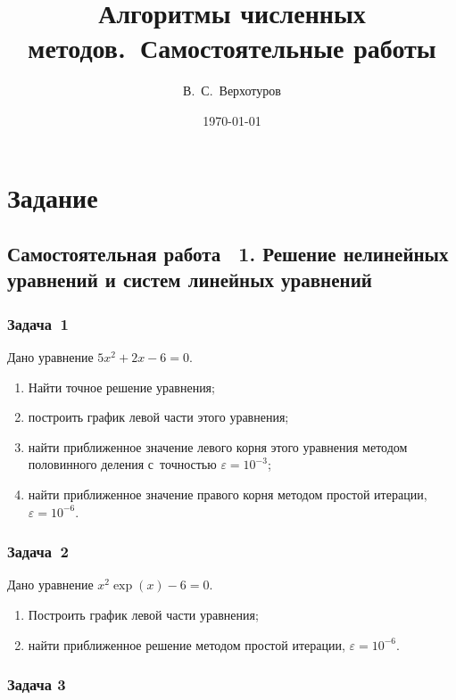 \documentclass[10pt, a4paper, titlepage, oneside]{article}
\title{Алгоритмы численных методов.~Самостоятельные работы}
\author{В.~С.~Верхотуров}
\affil{БСБО-05-20}
\affil{РТУ МИРЭА}
\date\today
\begin{document}
\maketitle

\tableofcontents
\newpage

\section*{Задание}


\subsection*{Самостоятельная работа \textnumero~1. Решение нелинейных уравнений и систем линейных уравнений}

\subsubsection*{Задача~1}

Дано уравнение $5x^2+2x-6=0$.

\begin{enumerate}
    \item Найти точное решение уравнения;
    \item построить график левой части этого уравнения;
    \item найти приближенное значение левого корня этого уравнения методом половинного деления с~точностью $\varepsilon=10^{-3}$;
    \item найти приближенное значение правого корня методом простой итерации, $\varepsilon=10^{-6}$.
\end{enumerate}

\subsubsection*{Задача~2}

Дано уравнение $x^2\exp(x)-6=0$.

\begin{enumerate}
    \item Построить график левой части уравнения;
    \item найти приближенное решение методом простой итерации, $\varepsilon=10^{-6}$.
\end{enumerate}

\subsubsection*{Задача 3}
\end{document}
